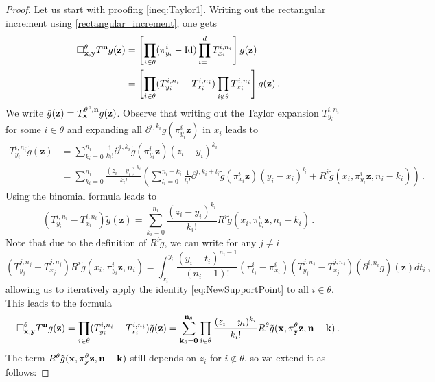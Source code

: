 \documentclass[12pt]{article}
\numberwithin{equation}{section}
\theoremstyle{plain}
\theoremstyle{definition}
\newcommand{\Id}{\mbox{Id}}
\def\fk{\mathbf k}\def\fl{\mathbf l}
\def\fy{\mathbf y}\def\fz{\mathbf z}
\def\foo{{\boldsymbol 0}}
\begin{document}
\begin{proof}Let us start with proofing \eqref{ineq:Taylor1}. Writing out the rectangular increment using \eqref{rectangular_increment}, one gets
    \begin{align*}
        \square_{\fx,\fy}^\theta T^\fn g(\fz) &= \left[\prod_{i\in\theta} (\pi^i_{y_i} -\Id) \prod_{i=1}^d T_{x_i}^{i,n_i}\right]g(\fz) \\
        &=\left[\prod_{i\in\theta} (T_{y_i}^{i,n_i}-T_{x_i}^{i,n_i}) \prod_{i\notin\theta} T_{x_i}^{i,n_i}\right]g(\fz)\,.
    \end{align*}
    We write $\tilde g(\fz) = T^{\theta^c,\fn}_\fx g(\fz)$. Observe that writing out the Taylor expansion $T^{i,n_i}_{y_i}$ for some $i\in\theta$ and expanding all $\partial^{i,k_i}g(\pi^i_{y_i}\fz)$ in $x_i$ leads to
     \begin{align*}
        T^{i,n_i}_{y_i} \tilde g(\fz) &= \sum_{k_i=0}^{n_i} \frac{1}{k_i!} \partial^{i,k_i} \tilde g(\pi_{y_i}^i\fz) (z_i-y_i)^{k_i}\\
        &= \sum_{k_i=0}^{n_i}  \frac{(z_i-y_i)^{k_i}}{k_i!} \left( \sum_{l_i= 0}^{n_i-k_i}\frac{1}{l_i!} \partial^{i,k_i+l_i} \tilde g(\pi^i_{x_i}\fz)(y_i-x_i)^{l_i} + R^i\tilde g(x_i,\pi_{y_i}^i\fz,n_i-k_i)\right)\,.
    \end{align*}
    Using the binomial formula leads to
    \begin{equation}\label{eq:NewSupportPoint}
    (T_{y_i}^{i,n_i} -T_{x_i}^{i,n_i})\tilde g(\fz) = \sum_{k_i=0}^{n_i} \frac{(z_i-y_i)^{k_i}}{k_i!} R^i\tilde g(x_i,\pi_{y_i}^i\fz,n_i-k_i)\,.
    \end{equation}
    Note that due to the definition of $R^i\tilde g$, we can write for any $j\neq i$
    \[
    (T^{j,n_j}_{y_j}- T^{j,n_j}_{x_j}) R^i\tilde g(x_i,\pi^i_{y_i}\fz,n_i) = \int_{x_i}^{y_i} \frac{(y_i-t_i)^{n_i-1}}{(n_i-1)!} (\pi^i_{t_i} - \pi^i_{x_i})(T^{j,n_j}_{y_j}- T^{j,n_j}_{x_j})\left(\partial^{i,n_i}\tilde g\right)(\fz) dt_i\,,
    \]
    allowing us to iteratively apply the identity \eqref{eq:NewSupportPoint} to all $i\in\theta$. This leads to the formula
    \begin{equation}\label{eq:rectangIncrementTaylorExpansion}
        \square_{\fx,\fy}^\theta T^\fn g(\fz) = \prod_{i\in\theta}(T^{i,n_i}_{y_i}- T^{i,n_i}_{x_i})\tilde g(\fz) = \sum_{\fk_\theta = \foo}^{\fn_\theta}\prod_{i\in\theta}\frac{(z_i-y_i)^{k_i}}{k_i!} R^\theta \tilde g(\fx,\pi^\theta_\fy \fz,\fn-\fk)\,.
    \end{equation}
    The term $R^\theta \tilde g(\fx,\pi^\theta_\fy \fz,\fn-\fk)$ still depends on $z_i$ for $i\notin\theta$, so we extend it as follows:

\end{proof}
\end{document}
